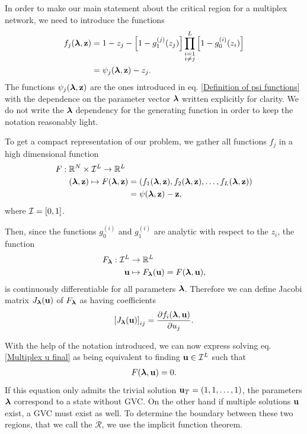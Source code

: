 \documentclass[
11pt, %
english, %
singlespacing, %
nolistspacing, %
liststotoc, %
headsepline, %
]{MastersDoctoralThesis} %
\begin{document}
In order to make our main statement about the critical region for a multiplex network, we need to introduce the functions
\begin{align}
	f_j(\boldsymbol{\mathrm{\lambda}}, \boldsymbol{\mathrm{z}}) &= 1 - z_j - \left[1 - g_1^{(j)}(z_j) \right] \prod_{\substack{i = 1 \\ i \neq j}}^{L}  \left[1 - g_0^{(i)}(z_i) \right] \label{Definition fj} \\
		&= \psi_j(\boldsymbol{\mathrm{\lambda}}, \boldsymbol{\mathrm{z}}) - z_j.
\end{align}
The functions $\psi_j(\boldsymbol{\mathrm{\lambda}}, \boldsymbol{\mathrm{z}})$ are the ones introduced in eq. \eqref{Definition of psi functions} with the dependence on the parameter vector $\boldsymbol{\mathrm{\lambda}}$ written explicitly for clarity. We do not write the $\boldsymbol{\mathrm{\lambda}}$ dependency for the generating function in order to keep the notation reasonably light.

To get a compact representation of our problem, we gather all functions $f_j$ in a high dimensional function
\begin{align}
	F : \; &\mathbb{R}^N \times \unitinterval^L \rightarrow \mathbb{R}^L\\
	&(\lambdavec, \zvec) \mapsto F(\lambdavec, \zvec) = (f_1(\lambdavec, \zvec), f_2(\lambdavec, \zvec), \dots, f_L(\lambdavec, \zvec)) \label{Definition F} \\
		&\hphantom{(\lambdavec, \zvec) \mapsto F(\lambdavec, \zvec)} = \psi(\lambdavec, \zvec) - \zvec,
\end{align}
where $\mathcal{I} = [0, 1]$.

Then, since the functions $g_0^{(i)}$ and $g_1^{(i)}$ are analytic with respect to the $z_i$, the function
\begin{align}
	F_{\boldsymbol{\mathrm{\lambda}}} : \mathcal{I}^L &\rightarrow \mathbb{R}^L\\
		\boldsymbol{\mathrm{u}} &\mapsto F_{\boldsymbol{\mathrm{\lambda}}}(\boldsymbol{\mathrm{u}}) = F(\boldsymbol{\mathrm{\lambda}}, \boldsymbol{\mathrm{u}}),
\end{align}
is continuously differentiable for all parameters $\boldsymbol{\mathrm{\lambda}}$. Therefore we can define Jacobi matrix $J_{\boldsymbol{\mathrm{\lambda}}}(\boldsymbol{\mathrm{u}})$ of $F_{\boldsymbol{\mathrm{\lambda}}}$ as having coefficients
\begin{align}
	\left[ J_{\boldsymbol{\mathrm{\lambda}}}(\boldsymbol{\mathrm{u}}) \right]_{ij} = \frac{\partial f_i(\boldsymbol{\mathrm{\lambda}},\boldsymbol{\mathrm{u}})}{\partial u_j}.
\end{align}

With the help of the notation introduced, we can now express solving eq. \eqref{Multiplex u final} as being equivalent to finding $\boldsymbol{\mathrm{u}} \in \mathcal{I}^L$ such that
\begin{align}
	F(\boldsymbol{\mathrm{\lambda}}, \boldsymbol{\mathrm{u}}) = 0. \label{Implicit equation}
\end{align}
If this equation only admits the trivial solution $\boldsymbol{\mathrm{u}}_T = (1, 1, \dots, 1)$, the parameters $\boldsymbol{\mathrm{\lambda}}$ correspond to a state without GVC. On the other hand if multiple solutions $\boldsymbol{\mathrm{u}}$ exist, a GVC must exist as well. To determine the boundary between these two regions, that we call the  $\mathcal{R}$, we use the implicit function theorem.
\end{document}
